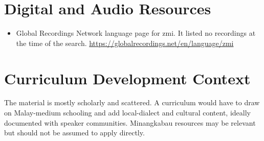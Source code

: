 \documentclass[12pt]{article}
\begin{document}
\section{Digital and Audio Resources}
\begin{itemize}
\item Global Recordings Network language page for zmi. It listed no recordings at the time of the search. \url{https://globalrecordings.net/en/language/zmi}
\end{itemize}

\section{Curriculum Development Context}
The material is mostly scholarly and scattered. A curriculum would have to draw on Malay-medium schooling and add local-dialect and cultural content, ideally documented with speaker communities. Minangkabau resources may be relevant but should not be assumed to apply directly.
\end{document}
